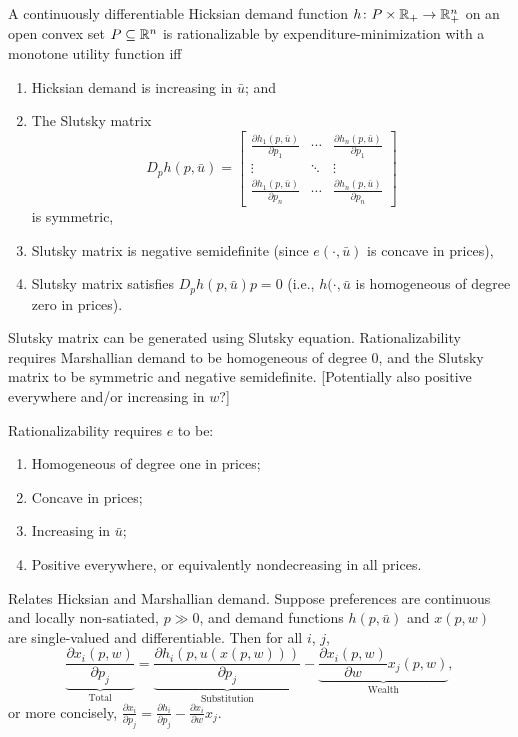 \documentclass[8pt,letterpaper, landscape]{extarticle} %
\begin{document}
\begin{multicols}{3}
\begin{description}
 A continuously differentiable Hicksian demand function $ h \colon P \times \mathbb{R}_{+} \to \mathbb{R}^{n}_{+} $ on an open convex set $ P \subseteq \mathbb{R}^n $ is rationalizable by expenditure-minimization with a monotone utility function iff
\begin{enumerate}
\item Hicksian demand is increasing in $ \bar{u} $; and
\item The Slutsky matrix
$$ D_p h(p, \bar{u}) = \begin{bmatrix}
\tfrac{\partial h_1 (p, \bar{u})}{\partial p_1} & \cdots & \tfrac{\partial h_n (p, \bar{u})}{\partial p_1} \\
\vdots & \ddots & \vdots \\
\tfrac{\partial h_1 (p, \bar{u})}{\partial p_n} & \cdots & \tfrac{\partial h_n (p, \bar{u})}{\partial p_n}
\end{bmatrix} $$
is symmetric,
\item Slutsky matrix is negative semidefinite (since $ e (\cdot, \bar{u}) $ is concave in prices),
\item Slutsky matrix satisfies $ D_p h(p, \bar{u}) p = 0 $ (i.e., $ h (\cdot, \bar{u} $ is homogeneous of degree zero in prices).
\end{enumerate}

 Slutsky matrix can be generated using Slutsky equation. Rationalizability requires Marshallian demand to be homogeneous of degree 0, and the Slutsky matrix to be symmetric and negative semidefinite. [Potentially also positive everywhere and/or increasing in $ w $?]

 Rationalizability requires $ e $ to be:
\begin{enumerate}
\item Homogeneous of degree one in prices;
\item Concave in prices;
\item Increasing in $ \bar{u} $;
\item Positive everywhere, or equivalently nondecreasing in all prices.
\end{enumerate}

 Relates Hicksian and Marshallian demand. Suppose preferences are continuous and locally non-satiated, $ p \gg 0 $, and demand functions $ h(p, \bar{u}) $ and $ x(p, w) $ are single-valued and differentiable. Then for all $ i $, $ j $,
$$ \underbrace{\frac{\partial x_i (p,w)}{\partial p_j}}_{\text{Total}} = \underbrace{\frac{\partial h_i (p, u(x(p,w)))}{\partial p_j}}_{\text{Substitution}} - \underbrace{\frac{\partial x_i (p, w)}{\partial w} x_j(p, w)}_{\text{Wealth}}, $$
or more concisely, $ \frac{\partial x_i}{\partial p_j} = \frac{\partial h_i}{\partial p_j} - \frac{\partial x_i}{\partial w} x_j $.


\end{description}
\end{multicols}
\end{document}
